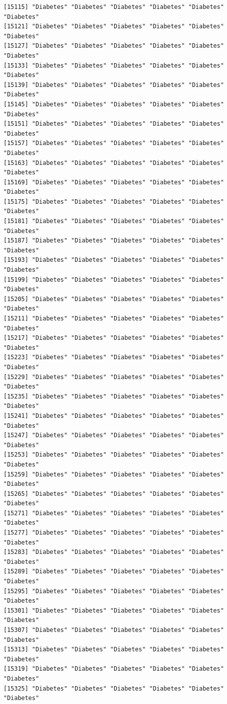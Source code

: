 \documentclass[
  letterpaper,
  DIV=11,
  numbers=noendperiod]{scrartcl}
\begin{document}
\begin{verbatim}
[15115] "Diabetes" "Diabetes" "Diabetes" "Diabetes" "Diabetes" "Diabetes"
[15121] "Diabetes" "Diabetes" "Diabetes" "Diabetes" "Diabetes" "Diabetes"
[15127] "Diabetes" "Diabetes" "Diabetes" "Diabetes" "Diabetes" "Diabetes"
[15133] "Diabetes" "Diabetes" "Diabetes" "Diabetes" "Diabetes" "Diabetes"
[15139] "Diabetes" "Diabetes" "Diabetes" "Diabetes" "Diabetes" "Diabetes"
[15145] "Diabetes" "Diabetes" "Diabetes" "Diabetes" "Diabetes" "Diabetes"
[15151] "Diabetes" "Diabetes" "Diabetes" "Diabetes" "Diabetes" "Diabetes"
[15157] "Diabetes" "Diabetes" "Diabetes" "Diabetes" "Diabetes" "Diabetes"
[15163] "Diabetes" "Diabetes" "Diabetes" "Diabetes" "Diabetes" "Diabetes"
[15169] "Diabetes" "Diabetes" "Diabetes" "Diabetes" "Diabetes" "Diabetes"
[15175] "Diabetes" "Diabetes" "Diabetes" "Diabetes" "Diabetes" "Diabetes"
[15181] "Diabetes" "Diabetes" "Diabetes" "Diabetes" "Diabetes" "Diabetes"
[15187] "Diabetes" "Diabetes" "Diabetes" "Diabetes" "Diabetes" "Diabetes"
[15193] "Diabetes" "Diabetes" "Diabetes" "Diabetes" "Diabetes" "Diabetes"
[15199] "Diabetes" "Diabetes" "Diabetes" "Diabetes" "Diabetes" "Diabetes"
[15205] "Diabetes" "Diabetes" "Diabetes" "Diabetes" "Diabetes" "Diabetes"
[15211] "Diabetes" "Diabetes" "Diabetes" "Diabetes" "Diabetes" "Diabetes"
[15217] "Diabetes" "Diabetes" "Diabetes" "Diabetes" "Diabetes" "Diabetes"
[15223] "Diabetes" "Diabetes" "Diabetes" "Diabetes" "Diabetes" "Diabetes"
[15229] "Diabetes" "Diabetes" "Diabetes" "Diabetes" "Diabetes" "Diabetes"
[15235] "Diabetes" "Diabetes" "Diabetes" "Diabetes" "Diabetes" "Diabetes"
[15241] "Diabetes" "Diabetes" "Diabetes" "Diabetes" "Diabetes" "Diabetes"
[15247] "Diabetes" "Diabetes" "Diabetes" "Diabetes" "Diabetes" "Diabetes"
[15253] "Diabetes" "Diabetes" "Diabetes" "Diabetes" "Diabetes" "Diabetes"
[15259] "Diabetes" "Diabetes" "Diabetes" "Diabetes" "Diabetes" "Diabetes"
[15265] "Diabetes" "Diabetes" "Diabetes" "Diabetes" "Diabetes" "Diabetes"
[15271] "Diabetes" "Diabetes" "Diabetes" "Diabetes" "Diabetes" "Diabetes"
[15277] "Diabetes" "Diabetes" "Diabetes" "Diabetes" "Diabetes" "Diabetes"
[15283] "Diabetes" "Diabetes" "Diabetes" "Diabetes" "Diabetes" "Diabetes"
[15289] "Diabetes" "Diabetes" "Diabetes" "Diabetes" "Diabetes" "Diabetes"
[15295] "Diabetes" "Diabetes" "Diabetes" "Diabetes" "Diabetes" "Diabetes"
[15301] "Diabetes" "Diabetes" "Diabetes" "Diabetes" "Diabetes" "Diabetes"
[15307] "Diabetes" "Diabetes" "Diabetes" "Diabetes" "Diabetes" "Diabetes"
[15313] "Diabetes" "Diabetes" "Diabetes" "Diabetes" "Diabetes" "Diabetes"
[15319] "Diabetes" "Diabetes" "Diabetes" "Diabetes" "Diabetes" "Diabetes"
[15325] "Diabetes" "Diabetes" "Diabetes" "Diabetes" "Diabetes" "Diabetes"

\end{verbatim}
\end{document}
